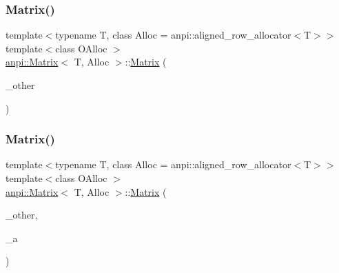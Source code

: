 \subsubsection{\texorpdfstring{Matrix()}{Matrix()}\hspace{0.1cm}{\footnotesize\ttfamily [11/17]}}
{\footnotesize\ttfamily template$<$typename T, class Alloc = anpi\+::aligned\+\_\+row\+\_\+allocator$<$\+T$>$$>$ \\
template$<$class O\+Alloc $>$ \\
\hyperlink{classanpi_1_1Matrix}{anpi\+::\+Matrix}$<$ T, Alloc $>$\+::\hyperlink{classanpi_1_1Matrix}{Matrix} (\begin{DoxyParamCaption}\item[{const \hyperlink{classanpi_1_1Matrix}{Matrix}$<$ T, O\+Alloc $>$ \&}]{\+\_\+other }\end{DoxyParamCaption})}

\mbox{\label{classanpi_1_1Matrix_a6448a8879a4241b92ef27e31be59f372}} 
\subsubsection{\texorpdfstring{Matrix()}{Matrix()}\hspace{0.1cm}{\footnotesize\ttfamily [12/17]}}
{\footnotesize\ttfamily template$<$typename T, class Alloc = anpi\+::aligned\+\_\+row\+\_\+allocator$<$\+T$>$$>$ \\
template$<$class O\+Alloc $>$ \\
\hyperlink{classanpi_1_1Matrix}{anpi\+::\+Matrix}$<$ T, Alloc $>$\+::\hyperlink{classanpi_1_1Matrix}{Matrix} (\begin{DoxyParamCaption}\item[{const \hyperlink{classanpi_1_1Matrix}{Matrix}$<$ T, O\+Alloc $>$ \&}]{\+\_\+other,  }\item[{const \hyperlink{classanpi_1_1Matrix_a3574b7528e3ddfb2f7cdf446be8286c1}{allocator\+\_\+type} \&}]{\+\_\+a }\end{DoxyParamCaption})}

\mbox{\label{classanpi_1_1Matrix_afc314d5599ca66a9c1dc07e251a451ab}} 
